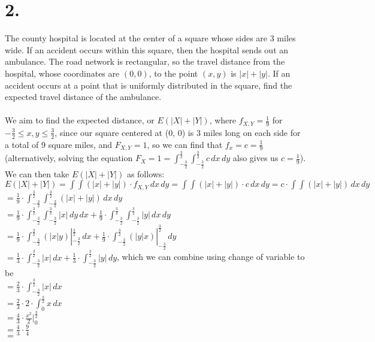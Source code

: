 \documentclass{article}
\begin{document}
\section*{2.}
{\Large

The county hospital is located at the center of a square
whose sides are $3$ miles wide. If an accident occurs within this
square, then the hospital sends out an ambulance. The road network
is rectangular, so the travel distance from the hospital, whose coordinates
are $(0,0)$, to the point $(x,y)$ is $|x|+|y|$. If an accident
occurs at a point that is uniformly distributed in the square, find
the expected travel distance of the ambulance. \\ \\ 
We aim to find the expected distance, or $E(|X| + |Y|)$, where $f_{X, Y} = \frac{1}{9}$ for $-\frac{3}{2} \leq x,y \leq \frac{3}{2}$, since our square centered at (0, 0) is 3 miles long on each side for a total of 9 square miles, and $F_{X, Y} = 1$, so we can find that $f_x = c = \frac{1}{9}$ (alternatively, solving the equation $F_X = 1 = \int_{-\frac{3}{2}}^{\frac{3}{2}} \int_{-\frac{3}{2}}^{\frac{3}{2}} c \,dx \,dy $ also gives us $c = \frac{1}{9}$). We can then take $E(|X| + |Y|)$ as follows: \\
$E(|X| + |Y|) = \int \int (|x| + |y|) \cdot f_{X, Y} \,dx \,dy = \int \int (|x| + |y|) \cdot c \,dx \,dy = c \cdot \int \int (|x| + |y|) \,dx \,dy$ \\
$ = \frac{1}{9} \cdot \int_{-\frac{3}{2}}^{\frac{3}{2}} \int_{-\frac{3}{2}}^{\frac{3}{2}} (|x| + |y|) \,dx \,dy$ \\ 
$ = \frac{1}{9} \cdot \int_{-\frac{3}{2}}^{\frac{3}{2}} \int_{-\frac{3}{2}}^{\frac{3}{2}} |x| \,dy \,dx + \frac{1}{9} \cdot \int_{-\frac{3}{2}}^{\frac{3}{2}} \int_{-\frac{3}{2}}^{\frac{3}{2}} |y| \,dx \,dy$ \\ 
$ = \frac{1}{9} \cdot \int_{-\frac{3}{2}}^{\frac{3}{2}} (|x|y) |_{-\frac{3}{2}}^{\frac{3}{2}} \,dx + \frac{1}{9} \cdot \int_{-\frac{3}{2}}^{\frac{3}{2}} (|y|x) |_{-\frac{3}{2}}^{\frac{3}{2}} \,dy$ \\ 
$ = \frac{1}{3} \cdot \int_{-\frac{3}{2}}^{\frac{3}{2}} |x| \,dx + \frac{1}{3} \cdot \int_{-\frac{3}{2}}^{\frac{3}{2}} |y| \,dy$, which we can combine using change of variable to be \\ 
$ = \frac{2}{3} \cdot \int_{-\frac{3}{2}}^{\frac{3}{2}} |x| \,dx$ \\ 
$ = \frac{2}{3} \cdot 2 \cdot \int_{0}^{\frac{3}{2}} x \,dx$ \\
$ = \frac{4}{3} \cdot \frac{x^2}{2} |_{0}^{\frac{3}{2}}$ \\
$ = \frac{4}{3} \cdot \frac{9}{4}$ \\
$ = $  

}
\end{document}
